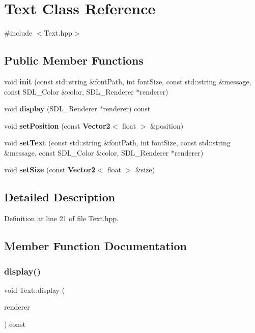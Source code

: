 \section{Text Class Reference}
\label{class_text}


{\ttfamily \#include $<$Text.\+hpp$>$}

\subsection*{Public Member Functions}
\begin{DoxyCompactItemize}
\item 
void \textbf{ init} (const std\+::string \&font\+Path, int font\+Size, const std\+::string \&message, const S\+D\+L\+\_\+\+Color \&color, S\+D\+L\+\_\+\+Renderer $\ast$renderer)
\item 
void \textbf{ display} (S\+D\+L\+\_\+\+Renderer $\ast$renderer) const
\item 
void \textbf{ set\+Position} (const \textbf{ Vector2}$<$ float $>$ \&position)
\item 
void \textbf{ set\+Text} (const std\+::string \&font\+Path, int font\+Size, const std\+::string \&message, const S\+D\+L\+\_\+\+Color \&color, S\+D\+L\+\_\+\+Renderer $\ast$renderer)
\item 
void \textbf{ set\+Size} (const \textbf{ Vector2}$<$ float $>$ \&size)
\end{DoxyCompactItemize}


\subsection{Detailed Description}


Definition at line 21 of file Text.\+hpp.



\subsection{Member Function Documentation}
\mbox{\label{class_text_a067064ef9f655bbad7028af4a5d9f068}} 
\subsubsection{display()}
{\footnotesize\ttfamily void Text\+::display (\begin{DoxyParamCaption}\item[{S\+D\+L\+\_\+\+Renderer $\ast$}]{renderer }\end{DoxyParamCaption}) const}



